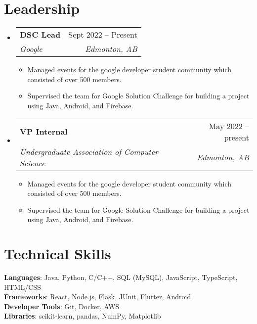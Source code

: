 \documentclass[letterpaper,11pt]{article}
\makeatletter
\newcommand{\resumeItem}[1]{
  \item\small{
    {#1 \vspace{-2pt}}
  }
}
\newcommand{\resumeSubheading}[4]{
  \vspace{-2pt}\item
    \begin{tabular*}{0.97\textwidth}[t]{l@{\extracolsep{\fill}}r}
      \textbf{#1} & #2 \\
      \textit{\small#3} & \textit{\small #4} \\
    \end{tabular*}\vspace{-7pt}
}
\newcommand{\resumeSubHeadingListStart}{\begin{itemize}[leftmargin=0.15in, label={}]}
\newcommand{\resumeSubHeadingListEnd}{\end{itemize}}
\newcommand{\resumeItemListStart}{\begin{itemize}}
\newcommand{\resumeItemListEnd}{\end{itemize}\vspace{-5pt}}
\makeatother
\begin{document}
\section{Leadership}
    \resumeSubHeadingListStart
      \resumeSubheading
        {DSC Lead}{Sept 2022 -- Present}
        {Google}{Edmonton, AB}
        \resumeItemListStart
          \resumeItem{Managed events for the google developer student community which consisted of over 500 members.}
          \resumeItem{Supervised the team for Google Solution Challenge for building a project using Java, Android, and Firebase.}
        \resumeItemListEnd
      \resumeSubheading
        {VP Internal}{May 2022 -- present}
        {Undergraduate Association of Computer Science}{Edmonton, AB}
        \resumeItemListStart
          \resumeItem{Managed events for the google developer student community which consisted of over 500 members.}
          \resumeItem{Supervised the team for Google Solution Challenge for building a project using Java, Android, and Firebase.}
        \resumeItemListEnd
    \resumeSubHeadingListEnd
%
\section{Technical Skills}
 \begin{itemize}[leftmargin=0.15in, label={}]
    \small{\item{
     \textbf{Languages}{: Java, Python, C/C++, SQL (MySQL), JavaScript, TypeScript, HTML/CSS} \\
     \textbf{Frameworks}{: React, Node.js, Flask, JUnit, Flutter, Android} \\
     \textbf{Developer Tools}{: Git, Docker, AWS} \\
     \textbf{Libraries}{: scikit-learn, pandas, NumPy, Matplotlib}
    }}
 \end{itemize}

\end{document}
